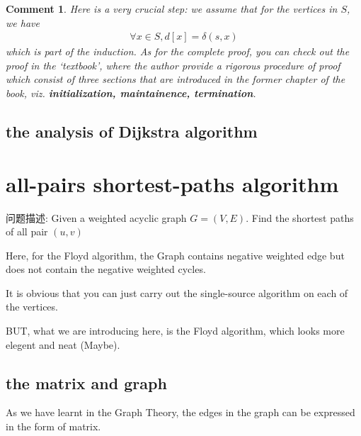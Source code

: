 \documentclass[a4paper, 10pt]{ctexart} %
\newtheorem{corollary}{Comment}
\begin{document}
\begin{corollary}
Here is a very crucial step: we 
assume that for the vertices in $S$,
we have
\begin{align*}
\forall x \in S,d[x ] = \delta \left( s , x\right)
\end{align*}
which is part of the induction. As for the 
complete proof, you can check out the 
proof in the `textbook', where the
author provide a 
rigorous procedure of 
proof which consist of 
three sections that are introduced in 
the former chapter of 
the book, viz. \textbf{initialization, maintainence, termination}.
\end{corollary}
\subsection{the analysis of Dijkstra algorithm}
\section{all-pairs shortest-paths algorithm}
问题描述: 
Given a weighted acyclic graph $G = \left(V , E\right)$.
Find the shortest paths of all 
pair $\left( u , v\right)$ 

Here, for the Floyd algorithm, the Graph 
contains negative weighted edge but 
does not contain the negative weighted 
cycles.

It is obvious that you 
can just carry out the 
single-source algorithm on 
each of the vertices.

BUT, what we are introducing here, 
is the Floyd algorithm, which looks 
more elegent and neat (Maybe).
\subsection{the matrix and graph}
As we have learnt in the Graph Theory, the
edges in the graph can be expressed
in the form of 
matrix. 
\end{document}
